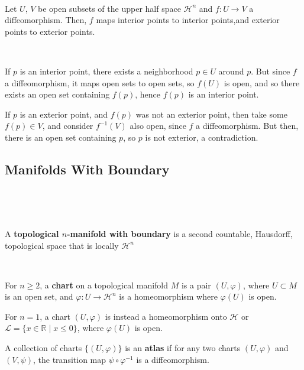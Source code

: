 \documentclass{article}
\begin{document}
\begin{proposition}
  \

  Let $U$, $V$ be open subsets of the upper half space $\mathcal{H}^n$ and $f: U \to V$ a diffeomorphism. Then, $f$ maps interior points to interior points,and exterior points to exterior points.
\end{proposition}

\begin{customproof}
  \

  If $p$ is an interior point, there exists a neighborhood $p \in U$ around $p$. But since $f$ a diffeomorphism, it maps open sets to open sets, so $f(U)$ is open, and so there exists an open set containing $f(p)$, hence $f(p)$ is an interior point.

  If $p$ is an exterior point, and $f(p)$ was not an exterior point, then take some $f(p) \in V$, and consider $f ^{-1}(V)$ also open, since $f$ a diffeomorphism. But then, there is an open set containing $p$, so $p$ is not exterior, a contradiction.
\end{customproof}

\subsection{Manifolds With Boundary}
\

\begin{definition}
  \

  A \textbf{topological $n$-manifold with boundary} is a second countable, Hausdorff, topological space that is locally $\mathcal{H}^n$
\end{definition}

\begin{definition}[Charts]
  \

  For $n \geq 2$, a \textbf{chart} on a topological manifold $M$ is a pair $(U, \varphi)$, where $U \subset M$ is an open set, and $\varphi: U \to \mathcal{H}^n$ is a homeomorphism where $\varphi(U)$ is open.

  For $n = 1$, a chart $(U,\varphi)$ is instead a homeomorphism onto $\mathcal{H}$ or $\mathcal{L} = \{x \in \mathbb{R} \mid x \leq 0\}$, where $\varphi(U)$ is open.

  A collection of charts $\{(U, \varphi)\}$ is an \textbf{atlas} if for any two charts $(U, \varphi)$ and $(V, \psi)$, the transition map $\psi \circ \varphi ^{-1}$ is a diffeomorphism.
\end{definition}
\end{document}
